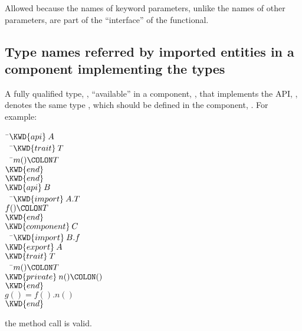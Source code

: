 Allowed because the names of keyword parameters, unlike the names of other parameters,
are part of the ``interface'' of the functional.

\subsection{Type names referred by imported entities in a component implementing the types}

A fully qualified type, , ``available'' in a component,
, that implements the API, ,
denotes the same type , which should be defined in the component,
.  For example:



\begin{Fortress}
{\tt~}\pushtabs\=\+\( \KWD{api}\:A\)\\
{\tt~~}\pushtabs\=\+\(   \KWD{trait}\:T\)\\
{\tt~~}\pushtabs\=\+\(     m()\COLON T\)\-\\\poptabs
\(   \KWD{end}\)\-\\\poptabs
\( \KWD{end}\)\\[4pt]
\( \KWD{api}\:B\)\\
{\tt~~}\pushtabs\=\+\(   \KWD{import}\:A.T\)\\
\(   f()\COLON T\)\-\\\poptabs
\( \KWD{end}\)\\[4pt]
\( \KWD{component}\:C\)\\
{\tt~~}\pushtabs\=\+\(   \KWD{import}\:B.f\)\\
\(   \KWD{export}\:A\)\\
\(   \KWD{trait}\:T\)\\
{\tt~~}\pushtabs\=\+\(     m()\COLON T\)\\
\(     \KWD{private}\:n()\COLON ()\)\-\\\poptabs
\(   \KWD{end}\)\\
\(   g() = f().n()\)\-\\\poptabs
\( \KWD{end}\)\-\\\poptabs
\end{Fortress}

the method call  is valid.

